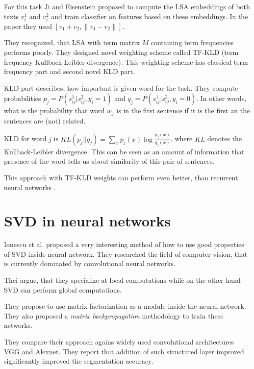         For this task Ji and Eisenstein proposed to compute the LSA embeddings of both texts $v_i^1$ and $v_i^2$ and train classifier on features based on these embeddings.
        In the paper they used $[v_1 + v_2, \| v_1- v_2 \|]$.
        
        They recognized, that LSA with term matrix $M$ containing term frequencies performs poorly. 
        They designed novel weighting scheme called TF-KLD (term frequency Kullback-Leibler divergence). 
        This weighting scheme has classical term frequency part and second novel KLD part.
        
        KLD part describes, how important is given word for the task.
        They compute probabilities $p_j = P(s_{ij}^1| s_{ij}^2, y_i=1)$ and $q_j = P(s_{ij}^1| s_{ij}^2, y_i=0)$.
        In other words, what is the probability that word $w_j$ is in the first sentence if it is the first an the sentences are (not) related.
        
        KLD for word $j$ is $KL(p_j || q_j) = \sum_x p_j(x) \log \frac{p_j(x)}{q_j(x)}$, where $KL$ denotes the Kullback-Leibler divergence.
        This can be seen as an amount of information that presence of the word tells us about similarity of this pair of sentences. 
    
        This approach with TF-KLD weights can perform even better, than recurrent neural networks \cite{conneau2017supervised}.
    
    
    \cite{wu2017balancing} %
    \cite{deng2014study} %
    \cite{lan2009supervised} %


\section{SVD in neural networks}
    Ionescu et al. \cite{ionescu2015training} %
    proposed a very interesting method of how to use good properties of SVD inside neural network.
    They researched the field of computer vision, that is currently dominated by convolutional neural networks.
    
    Thei argue, that they specialize at local computations while on the other hand SVD can perform global computations.
    
    They propose to use matrix factorization as a module inside the neural network.
    They also proposed a \emph{matrix backpropagation} methodology to train these networks.
    
    They compare their approach agains widely used convolutional architectures VGG and Alexnet. 
    They report that addition of such structured layer improved significantly improved the segmentation accuracy. 